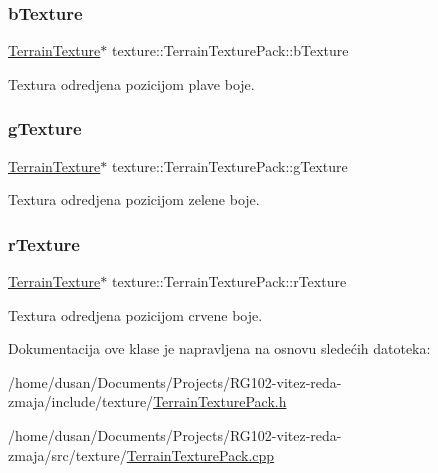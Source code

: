 \subsubsection{\texorpdfstring{b\+Texture}{bTexture}}
{\footnotesize\ttfamily \hyperlink{classtexture_1_1TerrainTexture}{Terrain\+Texture}$\ast$ texture\+::\+Terrain\+Texture\+Pack\+::b\+Texture\hspace{0.3cm}{\ttfamily [private]}}



Textura odredjena pozicijom plave boje. 

\mbox{\label{classtexture_1_1TerrainTexturePack_aee84140926644080ce963c6ffe5288da}} 
\subsubsection{\texorpdfstring{g\+Texture}{gTexture}}
{\footnotesize\ttfamily \hyperlink{classtexture_1_1TerrainTexture}{Terrain\+Texture}$\ast$ texture\+::\+Terrain\+Texture\+Pack\+::g\+Texture\hspace{0.3cm}{\ttfamily [private]}}



Textura odredjena pozicijom zelene boje. 

\mbox{\label{classtexture_1_1TerrainTexturePack_a08b5f1b7665151358b6b162627fc37d4}} 
\subsubsection{\texorpdfstring{r\+Texture}{rTexture}}
{\footnotesize\ttfamily \hyperlink{classtexture_1_1TerrainTexture}{Terrain\+Texture}$\ast$ texture\+::\+Terrain\+Texture\+Pack\+::r\+Texture\hspace{0.3cm}{\ttfamily [private]}}



Textura odredjena pozicijom crvene boje. 



Dokumentacija ove klase je napravljena na osnovu sledećih datoteka\+:\begin{DoxyCompactItemize}
\item 
/home/dusan/\+Documents/\+Projects/\+R\+G102-\/vitez-\/reda-\/zmaja/include/texture/\hyperlink{TerrainTexturePack_8h}{Terrain\+Texture\+Pack.\+h}\item 
/home/dusan/\+Documents/\+Projects/\+R\+G102-\/vitez-\/reda-\/zmaja/src/texture/\hyperlink{TerrainTexturePack_8cpp}{Terrain\+Texture\+Pack.\+cpp}\end{DoxyCompactItemize}
